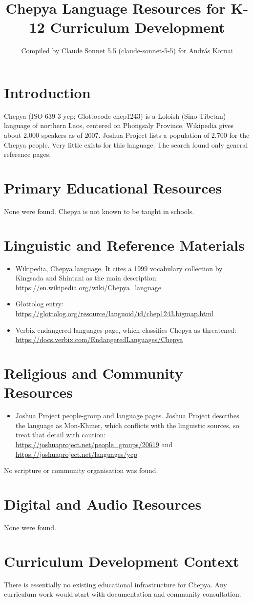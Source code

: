 \documentclass[12pt]{article}
\title{Chepya Language Resources for K-12 Curriculum Development}
\author{Compiled by Claude Sonnet 5.5 (claude-sonnet-5-5) for Andr\'as Kornai}
\date{}
\begin{document}
\maketitle

\section{Introduction}
Chepya (ISO 639-3 ycp; Glottocode chep1243) is a Loloish (Sino-Tibetan) language of northern Laos, centered on Phongsaly Province. Wikipedia gives about 2,000 speakers as of 2007. Joshua Project lists a population of 2,700 for the Chepya people. Very little exists for this language. The search found only general reference pages.

\section{Primary Educational Resources}
None were found. Chepya is not known to be taught in schools.

\section{Linguistic and Reference Materials}
\begin{itemize}
\item Wikipedia, Chepya language. It cites a 1999 vocabulary collection by Kingsada and Shintani as the main description: \url{https://en.wikipedia.org/wiki/Chepya_language}
\item Glottolog entry: \url{https://glottolog.org/resource/languoid/id/chep1243.bigmap.html}
\item Verbix endangered-languages page, which classifies Chepya as threatened: \url{https://docs.verbix.com/EndangeredLanguages/Chepya}
\end{itemize}

\section{Religious and Community Resources}
\begin{itemize}
\item Joshua Project people-group and language pages. Joshua Project describes the language as Mon-Khmer, which conflicts with the linguistic sources, so treat that detail with caution: \url{https://joshuaproject.net/people_groups/20619} and \url{https://joshuaproject.net/languages/ycp}
\end{itemize}
No scripture or community organisation was found.

\section{Digital and Audio Resources}
None were found.

\section{Curriculum Development Context}
There is essentially no existing educational infrastructure for Chepya. Any curriculum work would start with documentation and community consultation.
\end{document}
